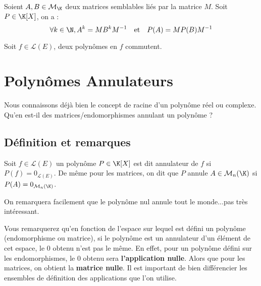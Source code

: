 \begin{prop}
    Soient $A,B\in \mathcal{M}_{\K}$ deux matrices semblables liés par la matrice $M$. Soit $P \in \K[X]$, on a :
        $$ \forall k \in \N, A^k = M B^k M ^{-1} \quad \text{et} \quad  P(A) = M P(B) M^{-1} $$
\end{prop}

\begin{prop}[Commutation]
    Soit $f \in \mathcal{L}(E)$, deux polynômes en $f$ commutent. 
\end{prop}



\section{Polynômes Annulateurs}

Nous connaissons déjà bien le concept de racine d'un polynôme réel ou complexe. 
Qu'en est-il des matrices/endomorphismes annulant un polynôme ?

\subsection{Définition et remarques}

\begin{definition}
    Soit $ f \in \mathcal{L}(E)$ un polynôme $ P \in \K[X]$ est dit annulateur de $f$ si $P(f) = 0_{\mathcal{L}(E)}$. 
    De même pour les matrices, on dit que $P$ annule $A \in \mathcal{M}_n(\K)$ si $P(A) = 0_{\mathcal{M}_n(\K)}$. 
\end{definition}

On remarquera facilement que le polynôme nul annule tout le monde...pas très intéressant. 

\begin{remark}
    Vous remarquerez qu'en fonction de l'espace sur lequel est défini un polynôme (endomorphisme ou matrice), 
    si le polynôme est un annulateur d'un élément de cet espace, le $0$ obtenu n'est pas le même. 
    En effet, pour un polynôme défini sur les endomorphismes, le 0 obtenu sera \textbf{l'application nulle}. 
    Alors que pour les matrices, on obtient la \textbf{matrice nulle}. 
    Il est important de bien différencier les ensembles de définition des applications que l'on utilise. 
\end{remark}

